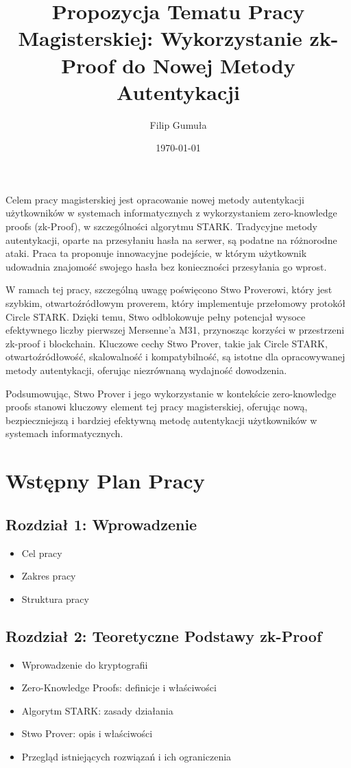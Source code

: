 \documentclass{article}
\title{Propozycja Tematu Pracy Magisterskiej: Wykorzystanie zk-Proof do Nowej Metody Autentykacji}
\author{Filip Gumuła}
\date{\today}
\begin{document}
\maketitle

Celem pracy magisterskiej jest opracowanie nowej metody autentykacji użytkowników w systemach informatycznych z wykorzystaniem zero-knowledge proofs (zk-Proof), w szczególności algorytmu STARK. Tradycyjne metody autentykacji, oparte na przesyłaniu hasła na serwer, są podatne na różnorodne ataki. Praca ta proponuje innowacyjne podejście, w którym użytkownik udowadnia znajomość swojego hasła bez konieczności przesyłania go wprost.

W ramach tej pracy, szczególną uwagę poświęcono Stwo Proverowi, który jest szybkim, otwartoźródłowym proverem, 
który implementuje przełomowy protokół Circle STARK. Dzięki temu, Stwo odblokowuje pełny potencjał wysoce 
efektywnego liczby pierwszej Mersenne'a M31, przynosząc korzyści w przestrzeni zk-proof i blockchain. 
Kluczowe cechy Stwo Prover, takie jak Circle STARK, otwartoźródłowość, skalowalność i kompatybilność, 
są istotne dla opracowywanej metody autentykacji, oferując niezrównaną wydajność dowodzenia. 

Podsumowując, Stwo Prover i jego wykorzystanie w kontekście zero-knowledge proofs stanowi kluczowy element tej pracy magisterskiej, oferując nową, bezpieczniejszą i bardziej efektywną metodę autentykacji użytkowników w systemach informatycznych.

\section{Wstępny Plan Pracy}
\subsection{Rozdział 1: Wprowadzenie}
\begin{itemize}
    \item Cel pracy
    \item Zakres pracy
    \item Struktura pracy
\end{itemize}

\subsection{Rozdział 2: Teoretyczne Podstawy zk-Proof}
\begin{itemize}
    \item Wprowadzenie do kryptografii
    \item Zero-Knowledge Proofs: definicje i właściwości
    \item Algorytm STARK: zasady działania
    \item Stwo Prover: opis i właściwości
    \item Przegląd istniejących rozwiązań i ich ograniczenia
\end{itemize}
\end{document}
